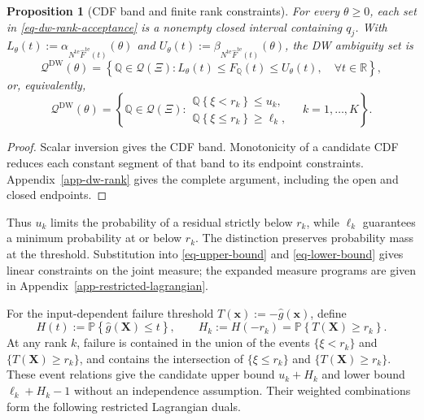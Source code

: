 \documentclass[review,11pt,3p,authoryear,nopreprintline]{elsarticle}
\newtheorem{proposition}{Proposition}
\begin{document}
\begin{proposition}[CDF band and finite rank constraints]
  \label{prop-finite-rank-constraints}
  For every $\theta\ge0$, each set in \eqref{eq-dw-rank-acceptance} is a nonempty closed interval containing $q_j$. With
  $L_\theta(t):=\alpha_{N^{\mathrm{te}}\widehat F^{\mathrm{te}}(t)}(\theta)$ and
  $U_\theta(t):=\beta_{N^{\mathrm{te}}\widehat F^{\mathrm{te}}(t)}(\theta)$, the DW ambiguity set is
  \begin{equation}
    \mathscr Q^{\mathrm{DW}}(\theta)
    =\left\{\mathbb Q\in\mathcal Q(\Xi):
    L_\theta(t)\le F_{\mathbb Q}(t)\le U_\theta(t),\quad\forall t\in\mathbb R\right\},
    \label{eq-dw-band-representation}
  \end{equation}
  or, equivalently,
  \begin{equation}
    \mathscr Q^{\mathrm{DW}}(\theta)
    =\left\{\mathbb Q\in\mathcal Q(\Xi):
    \begin{array}{l}
      \mathbb Q\left\{\xi<r_k\right\}\le u_k,\\
      \mathbb Q\left\{\xi\le r_k\right\}\ge\ell_k,
    \end{array}
    \quad k=1,\ldots,K\right\}.
    \label{eq-finite-rank-constraints}
  \end{equation}
\end{proposition}
\begin{proof}
  Scalar inversion gives the CDF band. Monotonicity of a candidate CDF reduces each constant segment of that band to its endpoint constraints. Appendix~\ref{app-dw-rank} gives the complete argument, including the open and closed endpoints.
\end{proof}

Thus $u_k$ limits the probability of a residual strictly below $r_k$, while $\ell_k$ guarantees a minimum probability at or below $r_k$. The distinction preserves probability mass at the threshold. Substitution into \eqref{eq-upper-bound} and \eqref{eq-lower-bound} gives linear constraints on the joint measure; the expanded measure programs are given in Appendix~\ref{app-restricted-lagrangian}.

For the input-dependent failure threshold $T(\bm x):=-\hat g(\bm x)$, define
\begin{equation}
  H(t):=\mathbb P\left\{\hat g(\bm X)\le t\right\},\qquad
  H_k:=H(-r_k)=\mathbb P\left\{T(\bm X)\ge r_k\right\}.
  \label{eq-surrogate-response-cdf}
\end{equation}
At any rank $k$, failure is contained in the union of the events $\{\xi<r_k\}$ and $\{T(\bm X)\ge r_k\}$, and contains the intersection of $\{\xi\le r_k\}$ and $\{T(\bm X)\ge r_k\}$. These event relations give the candidate upper bound $u_k+H_k$ and lower bound $\ell_k+H_k-1$ without an independence assumption. Their weighted combinations form the following restricted Lagrangian duals.
\end{document}
